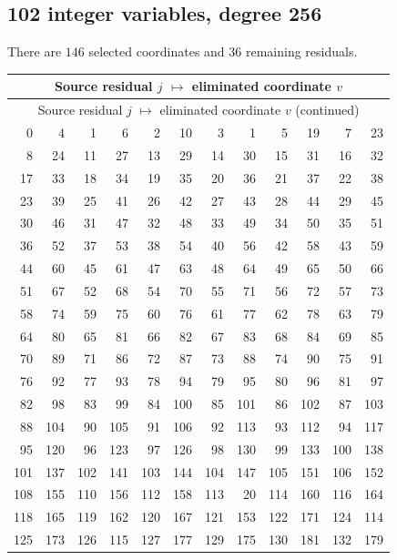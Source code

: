 \subsection{102 integer variables, degree 256}
There are $146$ selected coordinates and $36$ remaining residuals.
\begingroup
\small
\setlength{\tabcolsep}{4pt}
\begin{longtable}{*{6}{r@{\,$\mapsto$\,}r}}
\hline
\multicolumn{12}{c}{Source residual $j$ $\mapsto$ eliminated coordinate $v$}\\
\hline
\endfirsthead
\hline
\multicolumn{12}{c}{Source residual $j$ $\mapsto$ eliminated coordinate $v$ (continued)}\\
\hline
\endhead
0 & 4 & 1 & 6 & 2 & 10 & 3 & 1 & 5 & 19 & 7 & 23 \\
8 & 24 & 11 & 27 & 13 & 29 & 14 & 30 & 15 & 31 & 16 & 32 \\
17 & 33 & 18 & 34 & 19 & 35 & 20 & 36 & 21 & 37 & 22 & 38 \\
23 & 39 & 25 & 41 & 26 & 42 & 27 & 43 & 28 & 44 & 29 & 45 \\
30 & 46 & 31 & 47 & 32 & 48 & 33 & 49 & 34 & 50 & 35 & 51 \\
36 & 52 & 37 & 53 & 38 & 54 & 40 & 56 & 42 & 58 & 43 & 59 \\
44 & 60 & 45 & 61 & 47 & 63 & 48 & 64 & 49 & 65 & 50 & 66 \\
51 & 67 & 52 & 68 & 54 & 70 & 55 & 71 & 56 & 72 & 57 & 73 \\
58 & 74 & 59 & 75 & 60 & 76 & 61 & 77 & 62 & 78 & 63 & 79 \\
64 & 80 & 65 & 81 & 66 & 82 & 67 & 83 & 68 & 84 & 69 & 85 \\
70 & 89 & 71 & 86 & 72 & 87 & 73 & 88 & 74 & 90 & 75 & 91 \\
76 & 92 & 77 & 93 & 78 & 94 & 79 & 95 & 80 & 96 & 81 & 97 \\
82 & 98 & 83 & 99 & 84 & 100 & 85 & 101 & 86 & 102 & 87 & 103 \\
88 & 104 & 90 & 105 & 91 & 106 & 92 & 113 & 93 & 112 & 94 & 117 \\
95 & 120 & 96 & 123 & 97 & 126 & 98 & 130 & 99 & 133 & 100 & 138 \\
101 & 137 & 102 & 141 & 103 & 144 & 104 & 147 & 105 & 151 & 106 & 152 \\
108 & 155 & 110 & 156 & 112 & 158 & 113 & 20 & 114 & 160 & 116 & 164 \\
118 & 165 & 119 & 162 & 120 & 167 & 121 & 153 & 122 & 171 & 124 & 114 \\
125 & 173 & 126 & 115 & 127 & 177 & 129 & 175 & 130 & 181 & 132 & 179 \\

\end{longtable}
